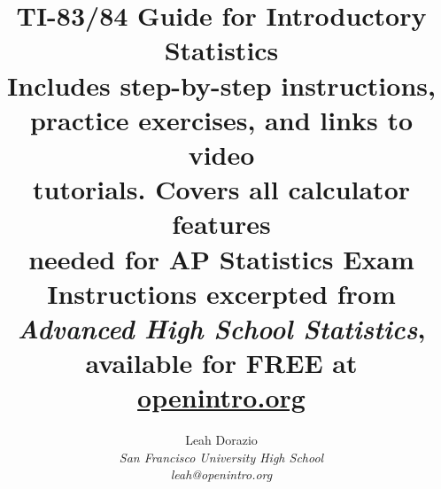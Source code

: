 
\title{\huge TI-83/84 Guide for Introductory Statistics\vspace{10mm} \\ \Large Includes step-by-step instructions, \\practice exercises, and links to video \\tutorials.  Covers all calculator features \\needed for AP\textregistered{}  Statistics Exam \vspace{10mm} \\ \Large Instructions excerpted from \\ \emph{Advanced High School Statistics}, \\available for FREE at \href{https://www.openintro.org/stat/textbook.php?stat_book=aps}{openintro.org} \vspace{20mm}}
\author{
Leah Dorazio \\
\small\emph{San Francisco University High School} \\
\small\emph{leah@openintro.org}}
